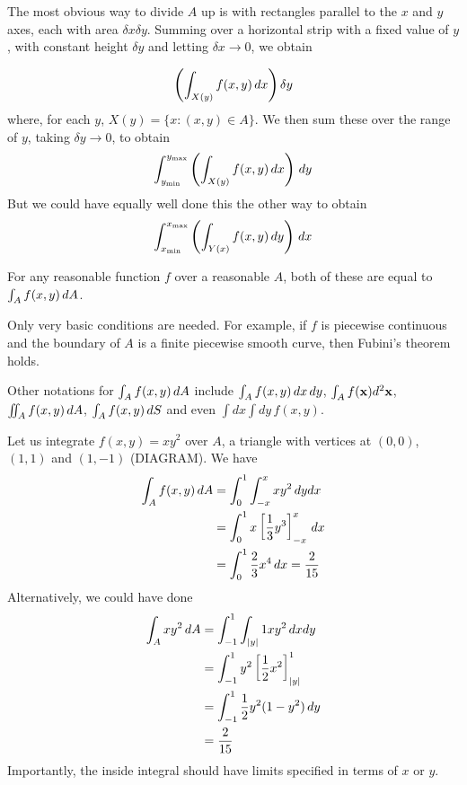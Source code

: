 \documentclass{../template/note}
\begin{document}
    The most obvious way to divide \(A\) up is with rectangles parallel to the \(x\) and \(y\) axes, each with area \(\delta x \delta y\). Summing over a horizontal strip with a fixed value of \(y\), with constant height \(\delta y\) and letting \(\delta x \to 0\), we obtain
    
    \begin{align*}
        \left(\int_{X(y)} f(x, y) \,d{x}\right)\delta y
    \end{align*}
    where, for each \(y\), \(X(y) = \{x: (x, y) \in A\}\). We then sum these over the range of \(y\), taking \(\delta y \to 0\), to obtain
    \begin{align*}
        \int_{y_{\min}}^{y_{\max}}\left(\int_{X(y)} f(x, y) \,d{x}\right)\,d{y}
    \end{align*}
    But we could have equally well done this the other way to obtain 
    \begin{align*}
        \int_{x_{\min}}^{x_{\max}}\left(\int_{Y(x)} f(x, y) \,d{y}\right)\,d{x}
    \end{align*}
    
    \begin{proposition*}
        For any reasonable function \(f\) over a reasonable \(A\), both of these are equal to \(\int_A f(x, y) \,d{A}\).
    \end{proposition*}
    
    \begin{remark*}
        Only very basic conditions are needed. For example, if \(f\) is piecewise continuous and the boundary of \(A\) is a finite piecewise smooth curve, then Fubini's theorem holds.
    \end{remark*}
    
    Other notations for \(\int_A f(x, y) \,d{A}\) include \(\int_A f(x, y) \,d{x} \,d{y}\), \(\int_A f(\V x) d^2 \V x\), \(\iint_A f(x, y) \,d{A}\), \(\int_A f(x, y) \,d{S}\) and even \(\int dx \int dy\, f(x, y)\).

    \begin{example*}
        Let us integrate \(f(x, y) = xy^2\) over \(A\), a triangle with vertices at \((0, 0)\), \((1, 1)\) and \((1, -1)\) (DIAGRAM). We have
        \begin{align*}
            \int_A f(x, y) \,d{A} &= \int_0^1 \int_{-x}^x xy^2 \,d{y} dx \\
            &= \int_0^1 x\left[\frac 1 3 y^3\right]^x_{-x} \,d{x} \\
            &= \int_0^1 \frac 2 3 x^4 \,d{x} = \frac 2 {15}
        \end{align*}
        Alternatively, we could have done
        \begin{align*}
            \int_A xy^2 \,d{A} &= \int_{-1}^1 \int_{|y|}{1} xy^2 \,d{x} dy \\
            &= \int_{-1}^1 y^2 \left[\frac 1 2 x^2\right]_{|y|}^1 \\
            &= \int_{-1}^1 \frac 1 2 y^2 (1-y^2) \,d{y} \\
            &= \frac 2 {15}
        \end{align*}
        Importantly, the inside integral should have limits specified in terms of \(x\) or \(y\).       
    \end{example*}
    
\end{document}
